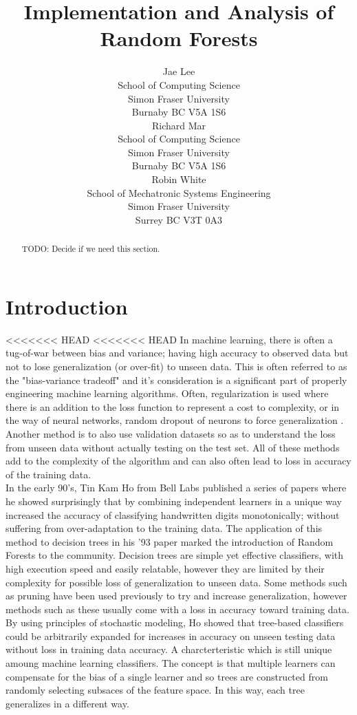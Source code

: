 \documentclass{article} %
\title{Implementation and Analysis of Random Forests}
\author{
Jae Lee\\
School of Computing Science\\
Simon Fraser University\\
Burnaby BC V5A 1S6 \\
\And
Richard Mar \\
School of Computing Science\\
Simon Fraser University\\
Burnaby BC V5A 1S6 \\
\AND
Robin White \\
School of Mechatronic Systems Engineering\\
Simon Fraser University\\
Surrey BC V3T 0A3 \\
}
\begin{document}
\maketitle

\begin{abstract}
TODO: Decide if we need this section.
\end{abstract}

\section{Introduction}

<<<<<<< HEAD
<<<<<<< HEAD
In machine learning, there is often a tug-of-war between bias and variance; having high accuracy to observed data but not to lose generalization (or over-fit) to unseen data. This is often referred to as the "bias-variance tradeoff" and it's consideration is a significant part of properly engineering machine learning algorithms. Often, regularization is used where there is an addition to the loss function to represent a cost to complexity, or in the way of neural networks, random dropout of neurons to force generalization \cite{Srivastava2014}. Another method is to also use validation datasets so as to understand the loss from unseen data without actually testing on the test set. All of these methods add to the complexity of the algorithm and can also often lead to loss in accuracy of the training data.\\
In the early 90's, Tin Kam Ho from Bell Labs published a series of papers where he showed surprisingly that by combining independent learners in a unique way increased the accuracy of classifying handwritten digits monotonically; without suffering from over-adaptation to the training data. \cite{Ho93, Ho95, Ho98} The application of this method to decision trees in his '93 paper marked the introduction of Random Forests to the community. \cite{Ho93} Decision trees are simple yet effective classifiers, with high execution speed and easily relatable, however they are limited by their complexity for possible loss of generalization to unseen data. Some methods such as pruning have been used previously to try and increase generalization, however methods such as these usually come with a loss in accuracy toward training data. By using principles of stochastic modeling, Ho showed that tree-based classifiers could be arbitrarily expanded for increases in accuracy on unseen testing data without loss in training data accuracy. A charcterteristic which is still unique amoung machine learning classifiers. The concept is that multiple learners can compensate for the bias of a single learner and so trees are constructed from randomly selecting subsaces of the feature space. In this way, each tree generalizes in a different way. \\
\end{document}
